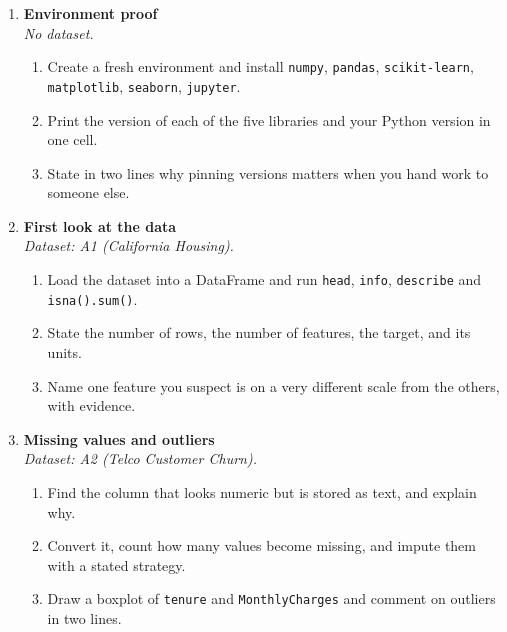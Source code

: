 \documentclass[11pt,a4paper]{article}
\begin{document}
\begin{enumerate}[label=\textbf{A\arabic*.}, leftmargin=*]

  \item \textbf{Environment proof} \\
    \emph{No dataset.}
    \begin{enumerate}[label=(\alph*), leftmargin=*]
      \item Create a fresh environment and install \texttt{numpy}, \texttt{pandas}, \texttt{scikit-learn}, \texttt{matplotlib}, \texttt{seaborn}, \texttt{jupyter}.
      \item Print the version of each of the five libraries and your Python version in one cell.
      \item State in two lines why pinning versions matters when you hand work to someone else.
    \end{enumerate}

  \item \textbf{First look at the data} \\
    \emph{Dataset: A1 (California Housing).}
    \begin{enumerate}[label=(\alph*), leftmargin=*]
      \item Load the dataset into a DataFrame and run \texttt{head}, \texttt{info}, \texttt{describe} and \texttt{isna().sum()}.
      \item State the number of rows, the number of features, the target, and its units.
      \item Name one feature you suspect is on a very different scale from the others, with evidence.
    \end{enumerate}

  \item \textbf{Missing values and outliers} \\
    \emph{Dataset: A2 (Telco Customer Churn).}
    \begin{enumerate}[label=(\alph*), leftmargin=*]
      \item Find the column that looks numeric but is stored as text, and explain why.
      \item Convert it, count how many values become missing, and impute them with a stated strategy.
      \item Draw a boxplot of \texttt{tenure} and \texttt{MonthlyCharges} and comment on outliers in two lines.
    \end{enumerate}

\end{enumerate}
\end{document}
